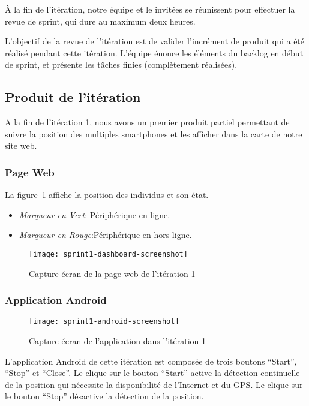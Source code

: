 À la fin de l'itération, notre équipe et le  invitées
se réunissent pour effectuer la revue de sprint, qui dure au maximum deux
heures.

L'objectif de la revue de l'itération est de valider l'incrément de produit qui
a été réalisé pendant cette itération. L'équipe énonce les éléments du backlog
en début de sprint, et présente les tâches finies (complètement réalisées).

\subsection{Produit de l'itération}

A la fin de l'itération 1, nous avons un premier produit partiel permettant de
suivre la position des multiples smartphones et les afficher dans la carte de
notre site web.

\subsubsection{Page Web }

La figure~\ref{fig:sprint1-dashboard-screenshot} affiche la position des
individus et son état.

\begin{itemize}
    \item \textit{Marqueur en Vert}: Périphérique en ligne.
    \item \textit{Marqueur en Rouge}:Périphérique en hors ligne.
\end{itemize}

\begin{figure}[H]
    \centering
    \texttt{[image: sprint1-dashboard-screenshot]}
    \caption{Capture écran de la page web de l'itération 1}
\label{fig:sprint1-dashboard-screenshot}
\end{figure}

\subsubsection{Application Android}

\begin{figure}[H]
    \centering
    \texttt{[image: sprint1-android-screenshot]}
    \caption{Capture écran de l'application dans l'itération 1}
\label{fig:sprint1-android-screenshot}
\end{figure}

L'application Android de cette itération est composée de trois boutons
``Start'', ``Stop'' et ``Close''.  Le clique sur le bouton ``Start'' active la
détection continuelle de la position qui nécessite la disponibilité de
l'Internet et du \acrshort{GPS}.  Le clique sur le bouton ``Stop'' désactive la
détection de la position.

